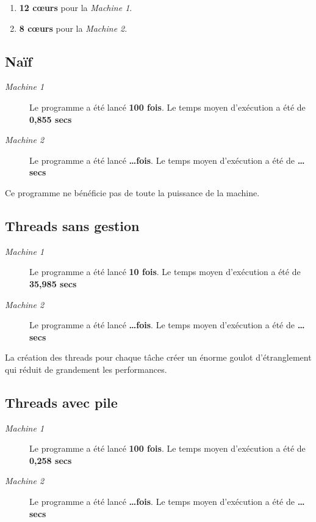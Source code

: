 \documentclass{article}
\def\coeurs{c\oe{}urs}
\begin{document}
\def\mone{\textit{Machine 1}} %
\def\mtwo{\textit{Machine 2}} %

\begin{enumerate}
  \item \textbf{12 \coeurs} pour la \mone.
  \item \textbf{8 \coeurs} pour la \mtwo.
\end{enumerate}

\subsection{Naïf}\label{stats:naive}
\begin{description}
  \item[\mone] Le programme a été lancé \textbf{100 fois}.
        Le temps moyen d'exécution a été de \textbf{0,855 secs}
  \item[\mtwo] Le programme a été lancé \textbf{\dots fois}.
        Le temps moyen d'exécution a été de \textbf{\dots secs}
\end{description}

Ce programme ne bénéficie pas de toute la puissance de la machine.

\subsection{Threads sans gestion}\label{stats:th_ges}
\begin{description}
  \item[\mone] Le programme a été lancé \textbf{10 fois}.
        Le temps moyen d'exécution a été de \textbf{35,985 secs}
  \item[\mtwo] Le programme a été lancé \textbf{\dots fois}.
        Le temps moyen d'exécution a été de \textbf{\dots secs}
\end{description}

La création des threads pour chaque tâche créer un énorme
goulot d'étranglement qui réduit de grandement les performances.

\subsection{Threads avec pile}
\begin{description}
  \item[\mone] Le programme a été lancé \textbf{100 fois}.
        Le temps moyen d'exécution a été de \textbf{0,258 secs}
  \item[\mtwo] Le programme a été lancé \textbf{\dots fois}.
        Le temps moyen d'exécution a été de \textbf{\dots secs}
\end{description}
\end{document}
